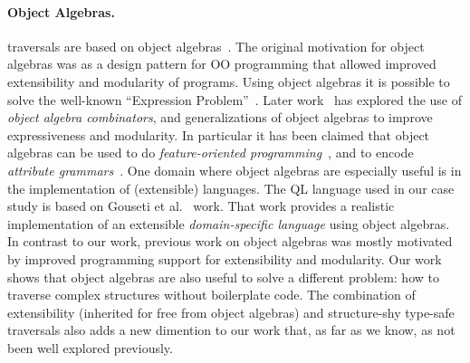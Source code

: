 

\begin{comment} 
In that
approach for generalized and basic folds. These fold algebras scale up
applications involving large systems of mutually recursive
datatypes. These works all try to optimize traversal control of large
structures in functional programming paradigm, while our work solves a
similar problem in Object Algebras, a programming style in Object
Oriented Programming paradigm.
\end{comment}

\paragraph{Object Algebras.} \name traversals are based on
object algebras~\cite{bruno12oa}. The original motivation for object
algebras was as a design pattern for OO programming that allowed
improved extensibility and modularity of programs.  Using object
algebras it is possible to solve the well-known ``Expression
Problem''~\cite{wadler98expression-problem}.  Later
work~\cite{oliveira13fop,rendel14attributes} has explored the use of
\emph{object algebra combinators}, and generalizations of object
algebras to improve expressiveness and modularity. In particular it
has been claimed that object algebras can be used to do
\emph{feature-oriented programming}~\cite{oliveira13fop}, and to
encode \emph{attribute grammars}~\cite{rendel14attributes}. One domain
where object algebras are especially useful is in the implementation
of (extensible) languages.  The QL language used in our case study is
based on Gouseti et al.~\cite{gouseti14extensible} work. That work
provides a realistic implementation of an extensible
\emph{domain-specific language} using object algebras. In contrast to
our work, previous work on object algebras was mostly motivated by
improved programming support for extensibility and modularity. Our
work shows that object algebras are also useful to solve a different
problem: how to traverse complex structures without boilerplate
code. The combination of extensibility (inherited for free from object
algebras) and structure-shy type-safe traversals also adds a new
dimention to our work that, as far as we know, as not been well explored
previously.

